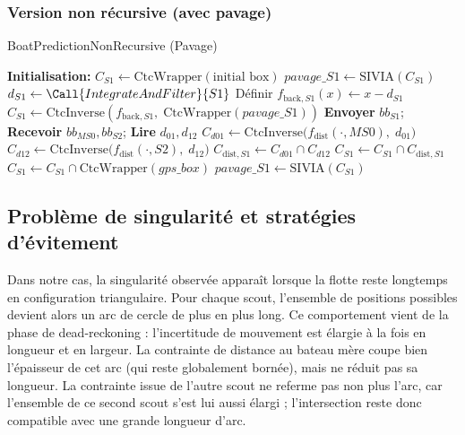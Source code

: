 \subsubsection*{Version non récursive (avec pavage)}
\noindent
\begin{algo-box}[label=alg:non_recursive]{BoatPredictionNonRecursive (Pavage)}
\begin{algorithmic}[1]
		\State \textbf{Initialisation:} $C_{S1} \gets \mathrm{CtcWrapper}(\text{initial box})$
		\State \colorbox{yellow!20}{$pavage\_S1 \gets \mathrm{SIVIA}(C_{S1})$} 
		\Statex
				\State $d_{S1} \gets \Call{IntegrateAndFilter}{S1}$
				\State Définir $f_{\mathrm{back},S1}(x) \gets x - d_{S1}$
				\State \colorbox{yellow!20}{$C_{S1} \gets \mathrm{CtcInverse}(f_{\mathrm{back},S1},\;\mathrm{CtcWrapper}(pavage\_S1))$}
				\Statex
				\State \textbf{Envoyer} $bb_{S1}$; \textbf{Recevoir} $bb_{MS0}, bb_{S2}$; \textbf{Lire} $d_{01}, d_{12}$
				\Statex
				\State $C_{d01} \gets \mathrm{CtcInverse}\bigl(f_{\mathrm{dist}}(\cdot,MS0),\;d_{01}\bigr)$
				\State $C_{d12} \gets \mathrm{CtcInverse}\bigl(f_{\mathrm{dist}}(\cdot,S2),\;d_{12}\bigr)$
				\Statex
				\State $C_{\mathrm{dist},S1} \gets C_{d01} \cap C_{d12}$
				\State $C_{S1} \gets C_{S1} \cap C_{\mathrm{dist},S1}$
						\State $C_{S1} \gets C_{S1} \cap \mathrm{CtcWrapper}(gps\_box)$
				\EndIf
				\Statex
				\State \colorbox{yellow!20}{$pavage\_S1 \gets \mathrm{SIVIA}(C_{S1})$} 
		\EndFor
\end{algorithmic}
\end{algo-box}

\subsection{Problème de singularité et stratégies d'évitement}

Dans notre cas, la singularité observée apparaît lorsque la flotte reste longtemps en configuration triangulaire. Pour chaque scout, l'ensemble de positions possibles devient alors un arc de cercle de plus en plus long. Ce comportement vient de la phase de dead-reckoning : l'incertitude de mouvement est élargie à la fois en longueur et en largeur. La contrainte de distance au bateau mère coupe bien l'épaisseur de cet arc (qui reste globalement bornée), mais ne réduit pas sa longueur. La contrainte issue de l'autre scout ne referme pas non plus l'arc, car l'ensemble de ce second scout s'est lui aussi élargi ; l'intersection reste donc compatible avec une grande longueur d'arc.

